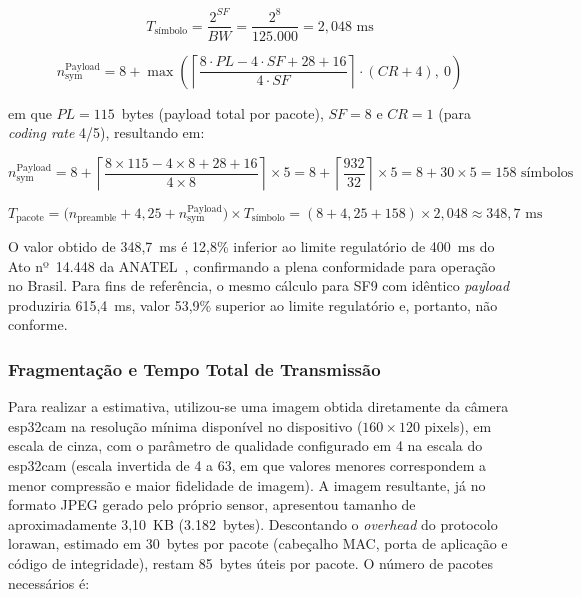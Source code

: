 \begin{equation}
  \label{eq:tsym}
  T_{\text{símbolo}} = \frac{2^{SF}}{BW} = \frac{2^8}{125{.}000} = 2{,}048 \text{ ms}
\end{equation}
 
\begin{equation}
  \label{eq:nsym}
  n_{\text{sym}}^{\text{Payload}} = 8 + \max\!\left(\left\lceil \frac{8 \cdot PL - 4 \cdot SF + 28 + 16}{4 \cdot SF} \right\rceil \cdot (CR + 4),\ 0\right)
\end{equation}
 
\noindent em que $PL = 115$~bytes (\gls{payload} total por pacote), $SF = 8$ e $CR = 1$
(para \textit{coding rate} 4/5), resultando em:
 
\begin{equation}
  n_{\text{sym}}^{\text{Payload}} = 8 + \left\lceil \frac{8 \times 115 - 4 \times 8 + 28 + 16}{4 \times 8} \right\rceil \times 5
  = 8 + \left\lceil \frac{932}{32} \right\rceil \times 5
  = 8 + 30 \times 5 = 158 \text{ símbolos}
\end{equation}
 
\begin{equation}
  \label{eq:tpacote}
  T_{\text{pacote}} = \bigl(n_{\text{preamble}} + 4{,}25 + n_{\text{sym}}^{\text{Payload}}\bigr) \times T_{\text{símbolo}}
  = \left(8 + 4{,}25 + 158\right) \times 2{,}048 \approx 348{,}7 \text{ ms}
\end{equation}
 
O valor obtido de 348,7~ms é 12,8\% inferior ao limite regulatório de 400~ms
do Ato nº~14.448 da ANATEL~\cite{anatel2017}, confirmando a plena conformidade
para operação no Brasil. Para fins de referência, o mesmo cálculo para SF9 com
idêntico \textit{\gls{payload}} produziria 615,4~ms, valor 53,9\% superior ao limite
regulatório e, portanto, não conforme.
 
\subsubsection{Fragmentação e Tempo Total de Transmissão}
 
Para realizar a estimativa, utilizou-se uma imagem obtida diretamente da câmera
\gls{esp32cam} na resolução mínima disponível no dispositivo ($160 \times 120$ pixels),
em escala de cinza, com o parâmetro de qualidade configurado em 4 na escala do
\gls{esp32cam} (escala invertida de 4 a 63, em que valores menores correspondem a menor
compressão e maior fidelidade de imagem). A imagem resultante, já no formato JPEG
gerado pelo próprio sensor, apresentou tamanho de aproximadamente 3,10~KB
(3.182~bytes). Descontando o \textit{overhead} do protocolo \gls{lorawan}, estimado em
30~bytes por pacote (cabeçalho MAC, porta de aplicação e código de integridade),
restam 85~bytes úteis por pacote. O número de pacotes necessários é:
 
